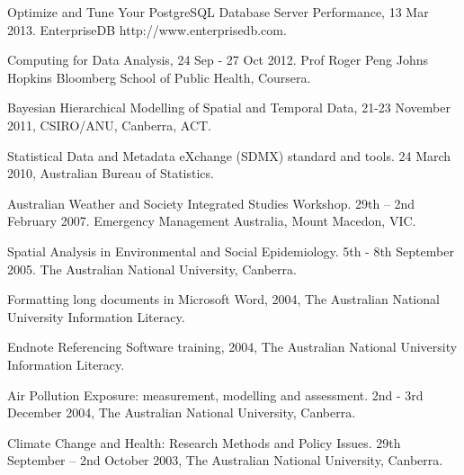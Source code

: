 \documentclass[a4paper,11pt]{article}
\begin{document}
\medskip
\renewcommand{\labelenumi}{\textsc{k}\theenumi.}
\begin{revnumerate}
\item Optimize and Tune Your PostgreSQL Database Server Performance, 13 Mar 2013.  EnterpriseDB http://www.enterprisedb.com. 

\item Computing for Data Analysis, 24 Sep - 27 Oct 2012.  Prof Roger Peng Johns Hopkins Bloomberg School of Public Health, Coursera.

\item Bayesian Hierarchical Modelling of Spatial and Temporal Data, 21-23 November 2011, CSIRO/ANU, Canberra, ACT.

\item Statistical Data and Metadata eXchange (SDMX) standard and tools.  24 March 2010, Australian Bureau of Statistics.

\item Australian Weather and Society Integrated Studies Workshop.  29th – 2nd February 2007.  Emergency Management Australia, Mount Macedon, VIC.

\item Spatial Analysis in Environmental and Social Epidemiology.  5th  - 8th  September 2005. The Australian National University, Canberra.

\item Formatting long documents in Microsoft Word, 2004, The Australian National University Information Literacy.

\item Endnote Referencing Software training, 2004, The Australian National University Information Literacy.

\item Air Pollution Exposure: measurement, modelling and assessment.  2nd - 3rd  December 2004, The Australian National University, Canberra. 

\item Climate Change and Health: Research Methods and Policy Issues.  29th September – 2nd  October 2003, The Australian National University, Canberra.
\end{revnumerate}
\medskip
\end{document}
